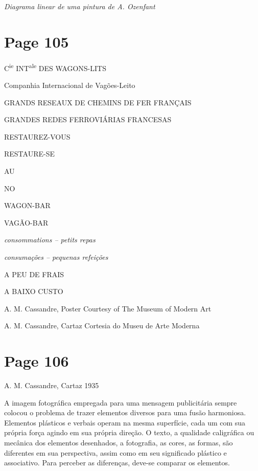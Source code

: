\documentclass[a4paper]{article}
\begin{document}
\bigskip

\noindent\textit{Diagrama linear de uma pintura de A. Ozenfant}

\newpage
\section*{Page 105}

\noindent C\textsuperscript{ie} INT\textsuperscript{ale} DES WAGONS-LITS
\par
\noindent Companhia Internacional de Vagões-Leito
\par
\vspace{1em}

\noindent GRANDS RESEAUX DE CHEMINS DE FER FRANÇAIS
\par
\noindent GRANDES REDES FERROVIÁRIAS FRANCESAS
\par
\vspace{1em}

\noindent RESTAUREZ-VOUS
\par
\noindent RESTAURE-SE
\par
\noindent AU
\par
\noindent NO
\par
\noindent WAGON-BAR
\par
\noindent VAGÃO-BAR
\par
\noindent \textit{consommations -- petits repas}
\par
\noindent \textit{consumações -- pequenas refeições}
\par
\noindent A PEU DE FRAIS
\par
\noindent A BAIXO CUSTO
\par
\vspace{2em}

\noindent A. M. Cassandre, Poster Courtesy of The Museum of Modern Art
\par
\noindent A. M. Cassandre, Cartaz Cortesia do Museu de Arte Moderna
\par
\vfill
\noindent {}

\newpage
\section*{Page 106}

A. M. Cassandre, Cartaz 1935

A imagem fotográfica empregada para uma mensagem publicitária sempre colocou o problema de trazer elementos diversos para uma fusão harmoniosa. Elementos plásticos e verbais operam na mesma superfície, cada um com sua própria força agindo em sua própria direção. O texto, a qualidade caligráfica ou mecânica dos elementos desenhados, a fotografia, as cores, as formas, são diferentes em sua perspectiva, assim como em seu significado plástico e associativo. Para perceber as diferenças, deve-se comparar os elementos.
\end{document}
